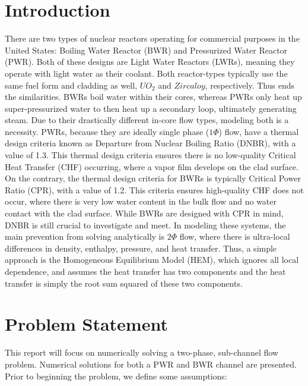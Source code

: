 \documentclass{article}
\begin{document}
\section{Introduction}
There are two types of nuclear reactors operating for commercial purposes in the United States: Boiling Water Reactor (BWR) and Pressurized Water Reactor (PWR). Both of these designs are Light Water Reactors (LWRs), meaning they operate with light water as their coolant. Both reactor-types typically use the same fuel form and cladding as well, $UO_2$ and $Zircaloy$, respectively. Thus ends the similarities. BWRs boil water within their cores, whereas PWRs only heat up super-pressurized water to then heat up a secondary loop, ultimately generating steam. Due to their drastically different in-core flow types, modeling both is a necessity. PWRs, because they are ideally single phase ($1\Phi$) flow, have a thermal design criteria known as Departure from Nuclear Boiling Ratio (DNBR), with a value of 1.3. This thermal design criteria ensures there is no low-quality Critical Heat Transfer (CHF) occurring, where a vapor film develops on the clad surface. On the contrary, the thermal design criteria for BWRs is typically Critical Power Ratio (CPR), with a value of 1.2. This criteria ensures high-quality CHF does not occur, where there is very low water content in the bulk flow and no water contact with the clad surface. While BWRs are designed with CPR in mind, DNBR is still crucial to investigate and meet.
In modeling these systems, the main prevention from solving analytically is $2\Phi$ flow, where there is ultra-local differences in density, enthalpy, pressure, and heat transfer. Thus, a simple approach is the Homogeneous Equilibrium Model (HEM), which ignores all local dependence, and assumes the heat transfer has two components and the heat transfer is simply the root sum squared of these two components. 

\clearpage
\section{Problem Statement}

This report will focus on numerically solving a two-phase, sub-channel flow problem. Numerical solutions for both a PWR and BWR channel are presented. Prior to beginning the problem, we define some assumptions:
\end{document}
